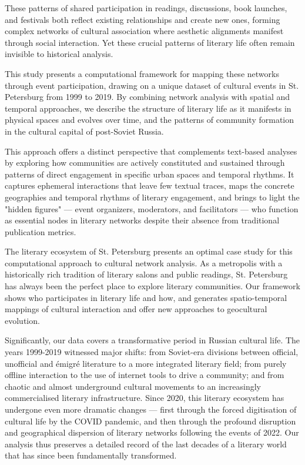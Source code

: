 \documentclass{jcls}
\begin{document}
These patterns of shared participation in readings, discussions, book launches, and festivals both reflect existing relationships and create new ones, forming complex networks of cultural association where aesthetic alignments manifest through social interaction. Yet these crucial patterns of literary life often remain invisible to historical analysis.

This study presents a computational framework for mapping these networks through event participation, drawing on a unique dataset of cultural events in St. Petersburg from 1999 to 2019. By combining network analysis with spatial and temporal approaches, we describe the structure of literary life as it manifests in physical spaces and evolves over time, and the patterns of community formation in the cultural capital of post-Soviet Russia.

This approach offers a distinct perspective that complements text-based analyses by exploring how communities are actively constituted and sustained through patterns of direct engagement in specific urban spaces and temporal rhythms. It captures ephemeral interactions that leave few textual traces, maps the concrete geographies and temporal rhythms of literary engagement, and brings to light the "hidden figures" — event organizers, moderators, and facilitators — who function as essential nodes in literary networks despite their absence from traditional publication metrics. 

The literary ecosystem of St. Petersburg presents an optimal case study for this computational approach to cultural network analysis. As a metropolis with a historically rich tradition of literary salons and public readings, St. Petersburg has always been the perfect place to explore  literary communities. Our framework shows who participates in literary life and how, and generates spatio-temporal mappings of cultural interaction and offer new approaches to geocultural evolution.

Significantly, our data  covers a transformative period in Russian cultural life. The years 1999-2019 witnessed major shifts: from Soviet-era divisions between official, unofficial and émigré literature to a more integrated literary field; from purely offline interaction to the use of internet tools to drive a community; and from chaotic and almost underground cultural movements to an increasingly commercialised literary infrastructure. Since 2020, this literary ecosystem has undergone even more dramatic changes — first through the forced digitisation of cultural life by the COVID pandemic, and then through the profound disruption and geographical dispersion of literary networks following the events of 2022. Our analysis thus preserves a detailed record of the last decades of a literary world that has since been fundamentally transformed.
\end{document}

